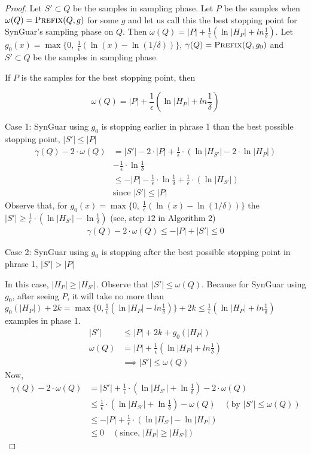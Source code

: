 \documentclass[11pt]{extarticle}
\newcommand{\tool}{{\sc SynGuar}\xspace}
\newcommand{\parf}{g}
\begin{document}
\begin{proof}
Let $S'\subset Q$ be the samples in sampling phase. Let $P$ be the samples when $\omega(Q)=\Call{Prefix}{Q,\parf}$ for some $\parf$ and let us call this the best stopping point for \tool's sampling phase on $Q$. Then $\omega(Q)=|P|+\frac{1}{\epsilon}(\ln{|H_P|} + ln{\frac{1}{\delta}})$.
Let $\parf_0(x)=\max\{0, ~\frac{1}{\epsilon}(\ln(x)-\ln(1/\delta))\}$, $\gamma(Q) = \Call{Prefix}{Q,\parf_0}$ and $S'\subset Q$ be the samples in sampling phase.

If $P$ is the samples for the best stopping point, then

$$
\omega(Q)=|P|+\frac{1}{\epsilon}(\ln{|H_P|} + ln{\frac{1}{\delta}})
$$

\noindent Case 1: \tool using $\parf_0$ is stopping earlier in phrase 1 than the best possible stopping point, $|S'| \leq |P|$
\begin{align*}
    \gamma(Q) - 2\cdot\omega(Q) &= |S'|- 2\cdot|P| +  \frac{1}{\epsilon}\cdot(\ln{|H_{S'}|} - 2\cdot \ln{|H_{P}|})\\ 
    &- \frac{1}{\epsilon}\cdot\ln{\frac{1}{\delta}}\\
    & \leq -|P| - \frac{1}{\epsilon}\cdot\ln{\frac{1}{\delta}} + \frac{1}{\epsilon}\cdot(\ln{|H_{S'}|})\\
    &\text{since }|S'| \leq |P|
\end{align*}
Observe that, for $\parf_0(x)=\max\{0, ~\frac{1}{\epsilon}(\ln(x)-\ln(1/\delta))\} $ the 
$|S'| \geq \frac{1}{\epsilon}\cdot(\ln{|H_{S'}|}-\ln{\frac{1}{\delta}})$ (see, step $12$ in Algorithm $2$)
\begin{align*}
    \gamma(Q) - 2\cdot\omega(Q) \leq -|P| + |S'| \leq 0
\end{align*}

\noindent Case 2: \tool using $\parf_0$ is stopping after the best possible stopping point in phrase 1,  $|S'| > |P|$

In this case, $|H_{P}|\ge|H_{S'}|$. Observe that $|S'| \le \omega(Q)$. Because for \tool using $\parf_0$, after seeing $P$, it will take no more than $\parf_0(|H_{P}|) + 2k =\max\{0, \frac{1}{\epsilon}(\ln{|H_{P}|} - ln{\frac{1}{\delta}})\} + 2k \leq \frac{1}{\epsilon}(\ln{|H_P|} + ln{\frac{1}{\delta}})$ examples in phase 1.
\begin{align*}
    |S'| &\le |P| + 2k + \parf_0(|H_{P}|)\\
    \omega(Q) &= |P| + \frac{1}{\epsilon}(\ln{|H_{P}|} + ln{\frac{1}{\delta}})\\
    &\implies |S'| \le \omega(Q)
\end{align*}
Now,
\begin{align*}
    \gamma(Q) - 2\cdot\omega(Q) &= |S'| + \frac{1}{\epsilon}\cdot(\ln{|H_{S'}|} + \ln{\frac{1}{\delta}}) - 2\cdot\omega(Q)\\
    &\leq \frac{1}{\epsilon}\cdot(\ln{|H_{S'}|} + \ln{\frac{1}{\delta}}) - \omega(Q) \quad(\text{by } |S'| \le \omega(Q))\\
    &\leq -|P| +\frac{1}{\epsilon}\cdot(\ln{|H_{S'}|} - \ln{|H_{P}|})\\
    &\leq 0 \quad (\text{since, }|H_{P}|\ge|H_{S'}|)
\end{align*}
\end{proof}



\end{document}
